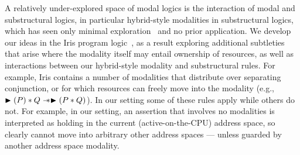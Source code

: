 A relatively under-explored space of modal logics is the interaction of modal and substructural logics, 
in particular hybrid-style modalities in substructural logics, which has seen only minimal exploration~ and no prior 
application. We develop our ideas in the Iris program logic~\cite{jung2018iris}, as a result exploring additional subtleties 
that arise where the modality itself may entail ownership of resources, as well as interactions between our hybrid-style 
modality and substructural rules.  For example, Iris contains a number of modalities that distribute over separating 
conjunction, or for which resources can freely move into the modality 
(e.g., $\blacktriangleright(P)\ast Q \mathrel{-\!\!\ast} \blacktriangleright(P\ast Q)$). In our setting some of these rules 
apply while others do not. For example, in our setting, an assertion that involves no modalities is interpreted as 
holding in the current (active-on-the-CPU) address space, so clearly cannot move into arbitrary other address spaces 
--- unless guarded by another address space modality.
